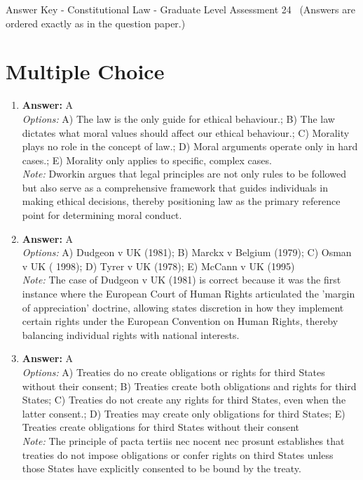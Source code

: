 \documentclass[12pt]{article}
\begin{document}
\begin{center}
Answer Key - Constitutional Law - Graduate Level Assessment 24 \
\small (Answers are ordered exactly as in the question paper.)
\end{center}

\section*{Multiple Choice}
\begin{enumerate}[label=\arabic*.]
\item \textbf{Answer:} A
\\ \textit{Options:} A) The law is the only guide for ethical behaviour.; B) The law dictates what moral values should affect our ethical behaviour.; C) Morality plays no role in the concept of law.; D) Moral arguments operate only in hard cases.; E) Morality only applies to specific, complex cases.
\\ \textit{Note:} Dworkin argues that legal principles are not only rules to be followed but also serve as a comprehensive framework that guides individuals in making ethical decisions, thereby positioning law as the primary reference point for determining moral conduct.
\item \textbf{Answer:} A
\\ \textit{Options:} A) Dudgeon v UK (1981); B) Marckx v Belgium (1979); C) Osman v UK ( 1998); D) Tyrer v UK (1978); E) McCann v UK (1995)
\\ \textit{Note:} The case of Dudgeon v UK (1981) is correct because it was the first instance where the European Court of Human Rights articulated the 'margin of appreciation' doctrine, allowing states discretion in how they implement certain rights under the European Convention on Human Rights, thereby balancing individual rights with national interests.
\item \textbf{Answer:} A
\\ \textit{Options:} A) Treaties do no create obligations or rights for third States without their consent; B) Treaties create both obligations and rights for third States; C) Treaties do not create any rights for third States, even when the latter consent.; D) Treaties may create only obligations for third States; E) Treaties create obligations for third States without their consent
\\ \textit{Note:} The principle of pacta tertiis nec nocent nec prosunt establishes that treaties do not impose obligations or confer rights on third States unless those States have explicitly consented to be bound by the treaty.

\end{enumerate}
\end{document}
